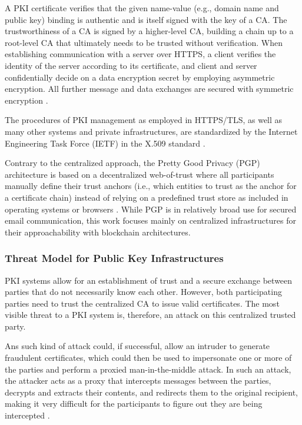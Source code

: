 A PKI certificate verifies that the given name-value (e.g., domain name and public key) binding is authentic and is itself signed with the key of a CA. The trustworthiness of a CA is signed by a higher-level CA, building a chain up to a root-level CA that ultimately needs to be trusted without verification. When establishing communication with a server over HTTPS, a client verifies the identity of the server according to its certificate, and client and server confidentially decide on a data encryption secret by employing asymmetric encryption. All further message and data exchanges are secured with symmetric encryption \cite{straub_tobias_usability_2006}.

The procedures of PKI management as employed in HTTPS/TLS, as well as many other systems and private infrastructures, are standardized by the Internet Engineering Task Force (IETF) in the X.509 standard \cite{adams_internet_2015}.

Contrary to the centralized approach, the Pretty Good Privacy (PGP) architecture is based on a decentralized web-of-trust where all participants manually define their trust anchors (i.e., which entities to trust as the anchor for a certificate chain) instead of relying on a predefined trust store as included in operating systems or browsers \cite{Straub2006}. While PGP is in relatively broad use for secured email communication, this work focuses mainly on centralized infrastructures for their approachability with blockchain architectures.


\subsubsection{Threat Model for Public Key Infrastructures}
\label{subsubsec:threat_model_pki}

PKI systems allow for an establishment of trust and a secure exchange between parties that do not necessarily know each other. However, both participating parties need to trust the centralized CA to issue valid certificates. The most visible threat to a PKI system is, therefore, an attack on this centralized trusted party.

Ans such kind of attack could, if successful, allow an intruder to generate fraudulent certificates, which could then be used to impersonate one or more of the parties and perform a proxied man-in-the-middle attack. In such an attack, the attacker acts as a proxy that intercepts messages between the parties, decrypts and extracts their contents, and redirects them to the original recipient, making it very difficult for the participants to figure out they are being intercepted \cite{zusman_criminal_2008}.

